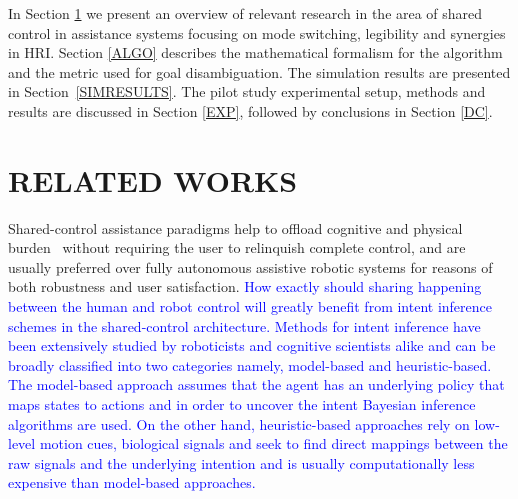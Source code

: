 \documentclass[conference]{IEEEtran}
\begin{document}

In Section \ref{RW} we present an overview of relevant research in the area of shared control in assistance systems focusing on mode switching, legibility and synergies in HRI. Section \ref{ALGO} describes the mathematical formalism for the algorithm and the metric used for goal disambiguation. The simulation results are presented in Section~\ref{SIMRESULTS}. The pilot study experimental setup, methods and results are discussed in Section \ref{EXP}, followed by conclusions in Section \ref{DC}.

\section{RELATED WORKS}\label{RW} 

Shared-control assistance paradigms help to offload cognitive and physical burden~\cite{volosyak2005rehabilitation} without requiring the user to relinquish complete control, and are usually preferred over fully autonomous assistive robotic systems for reasons of both robustness and user satisfaction. \textcolor{blue}{How exactly should sharing happening between the human and robot control will greatly benefit from intent inference schemes in the shared-control architecture. Methods for intent inference have been extensively studied by roboticists and cognitive scientists alike and can be broadly classified into two categories namely, model-based and heuristic-based. The model-based approach assumes that the agent has an underlying policy that maps states to actions and in order to uncover the intent Bayesian inference algorithms are used. On the other hand, heuristic-based approaches rely on low-level motion cues, biological signals and seek to find direct mappings between the raw signals and the underlying intention and is usually computationally less expensive than model-based approaches. }
\end{document}
